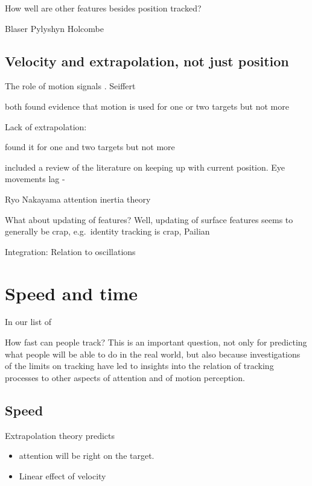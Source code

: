 \documentclass[]{book}
\providecommand{\tightlist}{%
  \setlength{\itemsep}{0pt}\setlength{\parskip}{0pt}}
\begin{document}
How well are other features besides position tracked?

Blaser Pylyshyn Holcombe

\hypertarget{velocity-and-extrapolation-not-just-position}{%
\section{Velocity and extrapolation, not just position}\label{velocity-and-extrapolation-not-just-position}}

The role of motion signals . Seiffert

\citet{fencsikRoleLocationMotion2007} \citet{howeMotionInformationSometimes2012} both found evidence that motion is used for one or two targets but not more

Lack of extrapolation:

\citet{fencsikRoleLocationMotion2007} found it for one and two targets but not more

\citet{howardPositionRepresentationsLag2011} included a review of the literature on keeping up with current position. Eye movements lag - \citet{lukavskyGazePositionLagging2016}

Ryo Nakayama attention inertia theory

What about updating of features? Well, updating of surface features seems to generally be crap, e.g.~identity tracking is crap, Pailian

Integration:
Relation to oscillations

\hypertarget{speed-and-time}{%
\chapter{Speed and time}\label{speed-and-time}}

In our list of

How fast can people track? This is an important question, not only for predicting what people will be able to do in the real world, but also because investigations of the limits on tracking have led to insights into the relation of tracking processes to other aspects of attention and of motion perception.

\hypertarget{speed}{%
\section{Speed}\label{speed}}

Extrapolation theory predicts

\begin{itemize}
\tightlist
\item
  attention will be right on the target.
\item
  Linear effect of velocity
\end{itemize}
\end{document}
